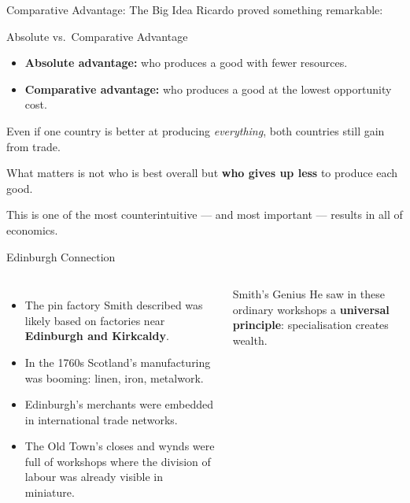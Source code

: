\documentclass[aspectratio=169, 10pt]{beamer}
\begin{document}
\begin{frame}{Comparative Advantage: The Big Idea}
Ricardo proved something remarkable:
\vspace{0.5em}
\begin{block}{Absolute vs.\ Comparative Advantage}
  \begin{itemize}
    \item \textbf{Absolute advantage:} who produces a good with
          fewer resources.
    \item \textbf{Comparative advantage:} who produces a good at
          the lowest \alert{opportunity cost}.
  \end{itemize}
\end{block}
\vspace{0.5em}
Even if one country is better at producing \textit{everything},
both countries still gain from trade.
\vspace{0.5em}

What matters is not who is best overall but
\textbf{who gives up less} to produce each good.

\vspace{0.5em}
This is one of the most counterintuitive --- and most important ---
results in all of economics.
\end{frame}

\begin{frame}{Edinburgh Connection}
\begin{columns}[T]
\begin{itemize}
  \item The pin factory Smith described was likely based on factories
        near \textbf{Edinburgh and Kirkcaldy}.
  \item In the 1760s Scotland's manufacturing was booming: linen,
        iron, metalwork.
  \item Edinburgh's merchants were embedded in international trade
        networks.
  \item The Old Town's closes and wynds were full of workshops where
        the division of labour was already visible in miniature.
\end{itemize}
\begin{block}{Smith's Genius}
He saw in these ordinary workshops a
\textbf{universal principle}: specialisation creates wealth.
\end{block}
\end{columns}
\end{frame}
\end{document}
